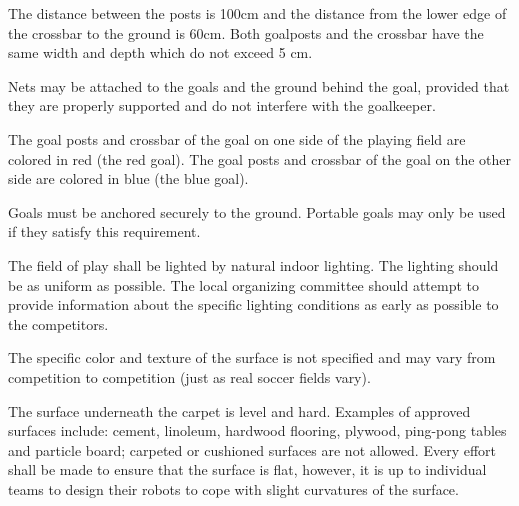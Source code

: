 \documentclass[12pt]{hurocup}
\begin{document}
\begin{lawlist}
\item The distance between the posts is 100cm and the distance from
  the lower edge of the crossbar to the ground is 60cm. Both goalposts
  and the crossbar have the same width and depth which do not exceed 5
  cm.
  
\item Nets may be attached to the goals and the ground behind the
  goal, provided that they are properly supported and do not interfere
  with the goalkeeper.
  
\item The goal posts and crossbar of the goal on one side of the
  playing field are colored in red (the red goal).
  The goal posts and crossbar of the goal on the other side are
  colored in blue (the blue goal).
  
\item Goals must be anchored securely to the ground. Portable goals
  may only be used if they satisfy this requirement.

\end{lawlist}

\begin{decisions}

\item The field of play shall be lighted by natural indoor
  lighting. The lighting should be as uniform as possible. The local
  organizing committee should attempt to provide information about the
  specific lighting conditions as early as possible to the
  competitors.
  
\item The specific color and texture of the surface is not specified
  and may vary from competition to competition (just as real soccer
  fields vary). 

\item The surface underneath the carpet is level and
  hard. Examples of approved surfaces include: cement, linoleum,
  hardwood flooring, plywood, ping-pong tables and particle board;
  carpeted or cushioned surfaces are not allowed. Every effort shall
  be made to ensure that the surface is flat, however, it is up to
  individual teams to design their robots to cope with slight
  curvatures of the surface.

\end{decisions}

\label{law:ball}
\end{document}
